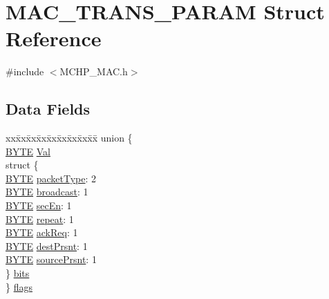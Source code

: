 \hypertarget{struct_m_a_c___t_r_a_n_s___p_a_r_a_m}{}\section{M\+A\+C\+\_\+\+T\+R\+A\+N\+S\+\_\+\+P\+A\+R\+A\+M Struct Reference}
\label{struct_m_a_c___t_r_a_n_s___p_a_r_a_m}


{\ttfamily \#include $<$M\+C\+H\+P\+\_\+\+M\+A\+C.\+h$>$}

\subsection*{Data Fields}
\begin{DoxyCompactItemize}
\item 
\begin{tabbing}
xx\=xx\=xx\=xx\=xx\=xx\=xx\=xx\=xx\=\kill
union \{\\
\>\hyperlink{_generic_type_defs_8h_a4ae1dab0fb4b072a66584546209e7d58}{BYTE} \hyperlink{struct_m_a_c___t_r_a_n_s___p_a_r_a_m_a5ab8c2bf45b20b5f7aa3a4f083896cec}{Val}\\
\>struct \{\\
\>\>\hyperlink{_generic_type_defs_8h_a4ae1dab0fb4b072a66584546209e7d58}{BYTE} \hyperlink{struct_m_a_c___t_r_a_n_s___p_a_r_a_m_ae9ba6cc7db0327ea0474edba2cbde11e}{packetType}: 2\\
\>\>\hyperlink{_generic_type_defs_8h_a4ae1dab0fb4b072a66584546209e7d58}{BYTE} \hyperlink{struct_m_a_c___t_r_a_n_s___p_a_r_a_m_a8b58296433643a710f3f46f836b7254b}{broadcast}: 1\\
\>\>\hyperlink{_generic_type_defs_8h_a4ae1dab0fb4b072a66584546209e7d58}{BYTE} \hyperlink{struct_m_a_c___t_r_a_n_s___p_a_r_a_m_a85e5fc5440ec2c1e9b7aaa3353b2de88}{secEn}: 1\\
\>\>\hyperlink{_generic_type_defs_8h_a4ae1dab0fb4b072a66584546209e7d58}{BYTE} \hyperlink{struct_m_a_c___t_r_a_n_s___p_a_r_a_m_ad174427cb4cda416943d7f2887bd8429}{repeat}: 1\\
\>\>\hyperlink{_generic_type_defs_8h_a4ae1dab0fb4b072a66584546209e7d58}{BYTE} \hyperlink{struct_m_a_c___t_r_a_n_s___p_a_r_a_m_ad6d800fe3f8e6e8dba107e2c4df200c0}{ackReq}: 1\\
\>\>\hyperlink{_generic_type_defs_8h_a4ae1dab0fb4b072a66584546209e7d58}{BYTE} \hyperlink{struct_m_a_c___t_r_a_n_s___p_a_r_a_m_a95924d7845a6b6b398cc32dd5087c0a7}{destPrsnt}: 1\\
\>\>\hyperlink{_generic_type_defs_8h_a4ae1dab0fb4b072a66584546209e7d58}{BYTE} \hyperlink{struct_m_a_c___t_r_a_n_s___p_a_r_a_m_a27dd21605fc04451aca0615da8b21582}{sourcePrsnt}: 1\\
\>\} \hyperlink{struct_m_a_c___t_r_a_n_s___p_a_r_a_m_a2ca4211a4ceb3f3a1a96fb3e3f041dfc}{bits}\\
\} \hyperlink{struct_m_a_c___t_r_a_n_s___p_a_r_a_m_aee20a5f98147e8b8c46b811665519667}{flags}\\


\end{tabbing}
\end{DoxyCompactItemize}
